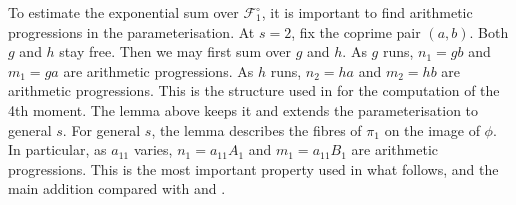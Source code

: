 To estimate the exponential sum over \(\mathscr{F}_1^\circ\), it is important to find arithmetic progressions in the parameterisation. At \(s=2\), fix the coprime pair \((a,b)\). Both \(g\) and \(h\) stay free. Then we may first sum over \(g\) and \(h\). As \(g\) runs, \(n_1=gb\) and \(m_1=ga\) are arithmetic progressions. As \(h\) runs, \(n_2=ha\) and \(m_2=hb\) are arithmetic progressions. This is the structure used in \cite[Lemma~3.4]{KX} for the computation of the 4th moment. The lemma above keeps it and extends the parameterisation to general \(s\).
For general $s$, the lemma describes the fibres of $\pi_1$ on the image of $\phi$.  In particular, as $a_{11}$ varies,
$n_1=a_{11}A_1$ and
$m_1=a_{11}B_1$ are arithmetic progressions.
This is the most important property used in what follows, and the main addition
compared with \cite[Lemma~2.3]{BNR} and \cite[\S8]{VW}.
